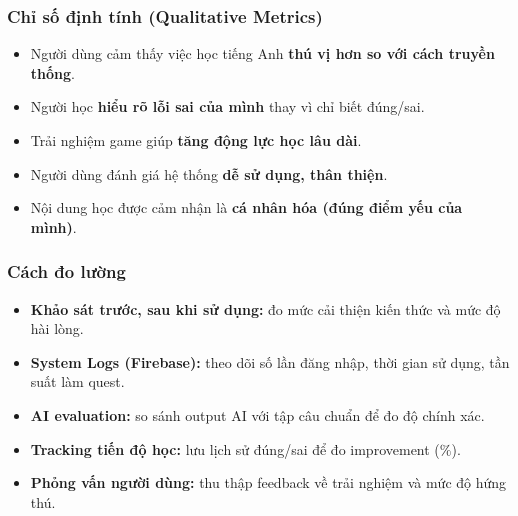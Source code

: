 \subsubsection{Chỉ số định tính (Qualitative Metrics)}
\begin{itemize}[label=-]
\item Người dùng cảm thấy việc học tiếng Anh \textbf{thú vị hơn so với cách truyền thống}.
\item Người học \textbf{hiểu rõ lỗi sai của mình} thay vì chỉ biết đúng/sai.
\item Trải nghiệm game giúp \textbf{tăng động lực học lâu dài}.
\item Người dùng đánh giá hệ thống \textbf{dễ sử dụng, thân thiện}.
\item Nội dung học được cảm nhận là \textbf{cá nhân hóa (đúng điểm yếu của mình)}.
\end{itemize}
\subsubsection{Cách đo lường}
\begin{itemize}[label=-]
\item \textbf{Khảo sát trước, sau khi sử dụng:} đo mức cải thiện kiến thức và mức độ hài lòng.
\item \textbf{System Logs (Firebase):} theo dõi số lần đăng nhập, thời gian sử dụng, tần suất làm quest.
\item \textbf{AI evaluation:} so sánh output AI với tập câu chuẩn để đo độ chính xác.
\item \textbf{Tracking tiến độ học:} lưu lịch sử đúng/sai để đo improvement ($\%$).
\item \textbf{Phỏng vấn người dùng:} thu thập feedback về trải nghiệm và mức độ hứng thú.
\end{itemize}